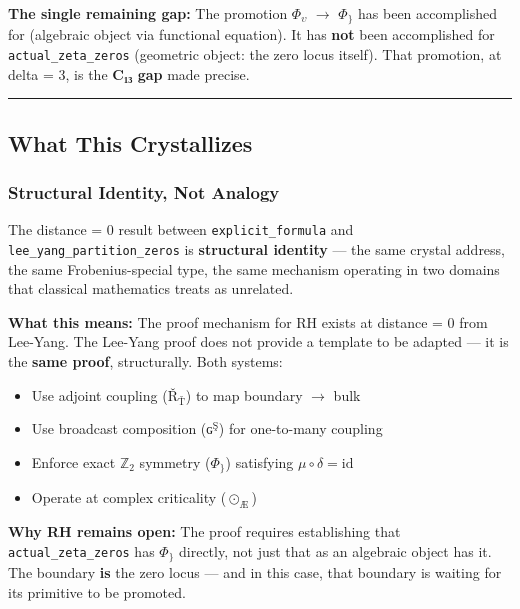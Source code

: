 \documentclass[12pt,a4paper]{article}
\begin{document}
\textbf{The single remaining gap:} The promotion $\Phi_{\upsilon}$ $\rightarrow$ $\Phi_{\}}$ has been accomplished for \xi (algebraic object via functional equation). It has \textbf{not} been accomplished for \texttt{actual\_zeta\_zeros} (geometric object: the zero locus itself). That promotion, at delta = 3, is the \textbf{C₁₃ gap} made precise.

\begin{center}
\rule{0.5\textwidth}{0.4pt}
\end{center}

\subsection{What This Crystallizes}

\subsubsection{Structural Identity, Not Analogy}

The distance = 0 result between \texttt{explicit\_formula} and \texttt{lee\_yang\_partition\_zeros} is \textbf{structural identity} --- the same crystal address, the same Frobenius-special type, the same mechanism operating in two domains that classical mathematics treats as unrelated.

\textbf{What this means:} The proof mechanism for RH exists at distance = 0 from Lee-Yang. The Lee-Yang proof does not provide a template to be adapted --- it is the \textbf{same proof}, structurally. Both systems:

\begin{itemize}
    \item Use adjoint coupling ($\text{Ř}_{\text{Ť}}$) to map boundary $\rightarrow$ bulk
    \item Use broadcast composition ($\text{ɢ}^{\text{Ş}}$) for one-to-many coupling
    \item Enforce exact $\mathbb{Z}_2$ symmetry ($\Phi_{\}}$) satisfying $\mu \circ \delta = \text{id}$
    \item Operate at complex criticality ($\odot_{\text{Æ}}$)
\end{itemize}

\textbf{Why RH remains open:} The proof requires establishing that \texttt{actual\_zeta\_zeros} has $\Phi_{\}}$ directly, not just that \xi as an algebraic object has it. The boundary \textbf{is} the zero locus --- and in this case, that boundary is waiting for its primitive to be promoted.
\end{document}
